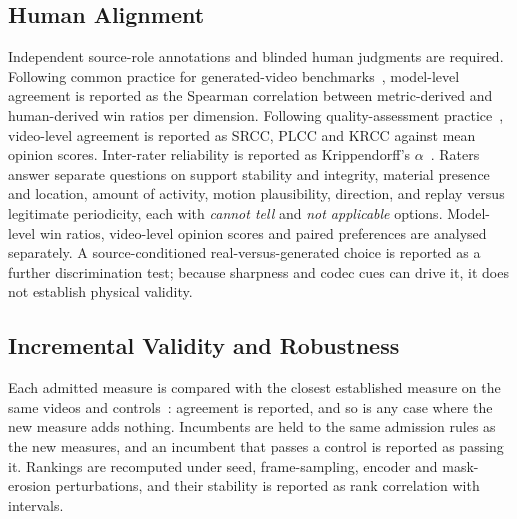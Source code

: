 \subsection{Human Alignment}
Independent source-role annotations and blinded human judgments are required. Following common practice for generated-video benchmarks~\cite{huang2023vbench,huang2024vbench++}, model-level agreement is reported as the Spearman correlation between metric-derived and human-derived win ratios per dimension. Following quality-assessment practice~\cite{kou2024t2vqa,hveval2026}, video-level agreement is reported as SRCC, PLCC and KRCC against mean opinion scores. Inter-rater reliability is reported as Krippendorff's $\alpha$~\cite{krippendorff2004content}. Raters answer separate questions on support stability and integrity, material presence and location, amount of activity, motion plausibility, direction, and replay versus legitimate periodicity, each with \emph{cannot tell} and \emph{not applicable} options. Model-level win ratios, video-level opinion scores and paired preferences are analysed separately. A source-conditioned real-versus-generated choice is reported as a further discrimination test; because sharpness and codec cues can drive it, it does not establish physical validity. 

\subsection{Incremental Validity and Robustness}
Each admitted measure is compared with the closest established measure on the same videos and controls~\cite{huang2023vbench,Zheng2025VBench20AV,duan2025worldscore,allen2025trajan,liu2024fvmd}: agreement is reported, and so is any case where the new measure adds nothing. Incumbents are held to the same admission rules as the new measures, and an incumbent that passes a control is reported as passing it. Rankings are recomputed under seed, frame-sampling, encoder and mask-erosion perturbations, and their stability is reported as rank correlation with intervals. 
